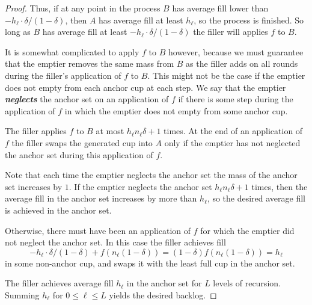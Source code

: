 \documentclass[twocolumn]{article}[10pt]
\newcommand{\defn}[1]{{\textit{\textbf{\boldmath #1}}}\xspace}
\begin{document}
\begin{proof}
  Thus, if at any point in the process $B$ has average fill lower than $-h_\ell
  \cdot \delta/(1-\delta)$, then $A$ has average fill at least $h_\ell$, so the
  process is finished. So long as $B$ has average fill at least $-h_\ell\cdot
  \delta/(1-\delta)$ the filler will applies $f$ to $B$.
  
  It is somewhat complicated to apply $f$ to $B$ however, because we must
  guarantee that the emptier removes the same mass from $B$ as the filler adds on
  all rounds during the filler's application of $f$ to $B$.
  This might not be the case if the emptier does not empty from each anchor cup
  at each step. We say that the emptier \defn{neglects} the anchor set on an
  application of $f$ if there is some step during the application of $f$ in
  which the emptier does not empty from some anchor cup.

  The filler applies $f$ to $B$ at most $h_\ell n_\ell\delta + 1$ times. 
  At the end of an application of $f$ the filler swaps the generated cup into $A$ only if the
  emptier has not neglected the anchor set during this application of $f$.

  Note that each time the emptier neglects the anchor set the mass of the
  anchor set increases by $1$. If the emptier neglects the anchor set $h_\ell
  n_\ell\delta + 1$ times, then the average fill in the anchor set increases by
  more than $h_\ell$, so the desired average fill is achieved in the anchor set.

  Otherwise, there must have been an application of $f$ for which the emptier
  did not neglect the anchor set. In this case the filler achieves fill 
  $$-h_\ell \cdot \delta/(1-\delta) + f(n_\ell (1-\delta)) = (1-\delta)f(n_\ell
  (1-\delta)) = h_\ell$$
  in some non-anchor cup, and swaps it with the least full cup in the anchor set.

  The filler achieves average fill $h_\ell$ in the anchor set for $L$ levels of
  recursion. Summing $h_\ell$ for $0\le \ell \le L$ yields the desired backlog.

\end{proof}
\end{document}
